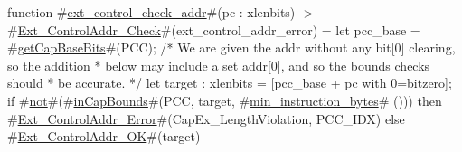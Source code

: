 function #\hyperref[sailRISCVzextzycontrolzycheckzyaddr]{ext\_control\_check\_addr}#(pc : xlenbits) -> #\hyperref[sailRISCVzExtzyControlAddrzyCheck]{Ext\_ControlAddr\_Check}#(ext_control_addr_error) = {
  let pcc_base = #\hyperref[sailRISCVzgetCapBaseBits]{getCapBaseBits}#(PCC);
  /* We are given the addr without any bit[0] clearing, so the addition
   * below may include a set addr[0], and so the bounds checks should
   * be accurate.
   */
  let target : xlenbits = [pcc_base + pc with 0=bitzero];
  if   #\hyperref[sailRISCVznot]{not}#(#\hyperref[sailRISCVzinCapBounds]{inCapBounds}#(PCC, target, #\hyperref[sailRISCVzminzyinstructionzybytes]{min\_instruction\_bytes}# ()))
  then #\hyperref[sailRISCVzExtzyControlAddrzyError]{Ext\_ControlAddr\_Error}#(CapEx_LengthViolation, PCC_IDX)
  else #\hyperref[sailRISCVzExtzyControlAddrzyOK]{Ext\_ControlAddr\_OK}#(target)
}
